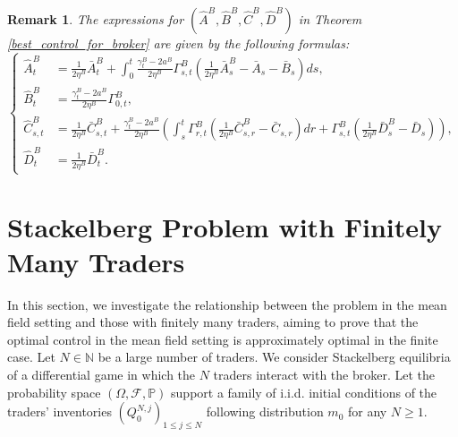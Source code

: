 \documentclass[10pt]{article}
\newtheorem{remark}[theorem]{Remark}
\begin{document}
\begin{remark}
The expressions for $(\hat A^B, \hat B^B, \hat C^B, \hat D^B)$ in Theorem \ref{best_control_for_broker} are given by the following formulas:
\[
\left\{
\begin{aligned}
\hat A^B_t & = \frac{1}{2\eta^B} \bar A^B_t + \int_0^t \frac{\gamma_t^B-2a^B}{2\eta^B} \Gamma_{s,t}^B \left( \frac{1}{2\eta^B} \bar A^B_s - \bar A_s - \bar B_s \right) ds,\\
\hat B^B_t & = \frac{\gamma_t^B-2a^B}{2\eta^B} \Gamma_{0,t}^B, \\
\hat C^B_{s,t} & = \frac{1}{2 \eta^B} \bar C_{s,t}^B + \frac{\gamma_t^B-2a^B}{2\eta^B} \left( \int_s^t \Gamma_{r,t}^B \left( \frac{1}{2\eta^B} \bar C_{s,r}^B - \bar C_{s,r} \right)dr + \Gamma_{s,t}^B (\frac{1}{2\eta^B} \bar D_s^B - \bar D_s ) \right), \\
\hat D^B_t & = \frac{1}{2 \eta^B} \bar D_{t}^B.
\end{aligned}
\right.
\]
\end{remark}

\section{Stackelberg Problem with Finitely Many Traders}\label{section_comments_finite}
In this section, we investigate the relationship between the problem in the mean field setting and those with finitely many traders, aiming to prove that the optimal control in the mean field setting is approximately optimal in the finite case. Let $N \in \mathbb{N}$ be a large number of traders. We consider Stackelberg equilibria of a differential game in which the $N$ traders interact with the broker. 
Let the probability space $\left(\Omega, \mathcal{F}, \mathbb{P}\right)$ support a family of i.i.d. initial conditions of the traders' inventories $(Q_0^{N,j})_{1 \leq j \leq N}$ following distribution $m_0$ for any $N \geq 1$.
\end{document}
